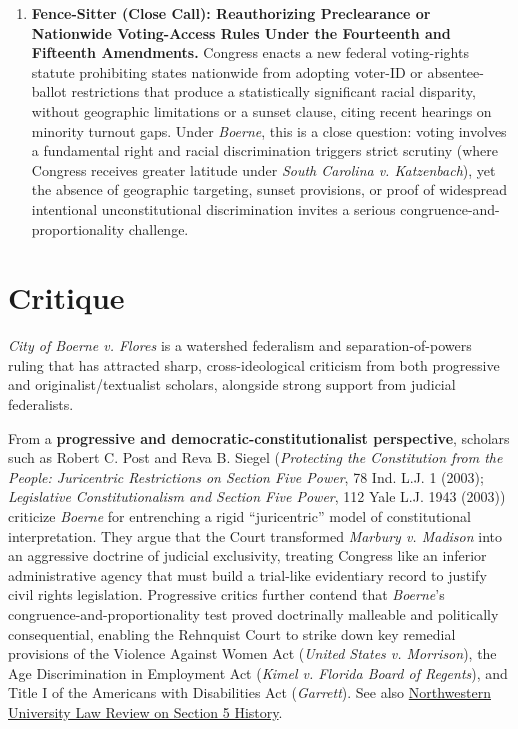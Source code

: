 \documentclass[12pt]{article}
\begin{document}
\begin{enumerate}
  \item \textbf{Fence-Sitter (Close Call): Reauthorizing Preclearance or Nationwide Voting-Access Rules Under the Fourteenth and Fifteenth Amendments.} Congress enacts a new federal voting-rights statute prohibiting states nationwide from adopting voter-ID or absentee-ballot restrictions that produce a statistically significant racial disparity, without geographic limitations or a sunset clause, citing recent hearings on minority turnout gaps. Under \textit{Boerne}, this is a close question: voting involves a fundamental right and racial discrimination triggers strict scrutiny (where Congress receives greater latitude under \textit{South Carolina v. Katzenbach}), yet the absence of geographic targeting, sunset provisions, or proof of widespread intentional unconstitutional discrimination invites a serious congruence-and-proportionality challenge.
\end{enumerate}

\section{Critique}

\textit{City of Boerne v. Flores} is a watershed federalism and separation-of-powers ruling that has attracted sharp, cross-ideological criticism from both progressive and originalist/textualist scholars, alongside strong support from judicial federalists.

From a \textbf{progressive and democratic-constitutionalist perspective}, scholars such as Robert C. Post and Reva B. Siegel (\textit{Protecting the Constitution from the People: Juricentric Restrictions on Section Five Power}, 78 Ind. L.J. 1 (2003); \textit{Legislative Constitutionalism and Section Five Power}, 112 Yale L.J. 1943 (2003)) criticize \textit{Boerne} for entrenching a rigid ``juricentric'' model of constitutional interpretation. They argue that the Court transformed \textit{Marbury v. Madison} into an aggressive doctrine of judicial exclusivity, treating Congress like an inferior administrative agency that must build a trial-like evidentiary record to justify civil rights legislation. Progressive critics further contend that \textit{Boerne}'s congruence-and-proportionality test proved doctrinally malleable and politically consequential, enabling the Rehnquist Court to strike down key remedial provisions of the Violence Against Women Act (\textit{United States v. Morrison}), the Age Discrimination in Employment Act (\textit{Kimel v. Florida Board of Regents}), and Title I of the Americans with Disabilities Act (\textit{Garrett}). See also \href{https://scholarlycommons.law.northwestern.edu/cgi/viewcontent.cgi?article=1349&context=nulr}{Northwestern University Law Review on Section 5 History}.
\end{document}
